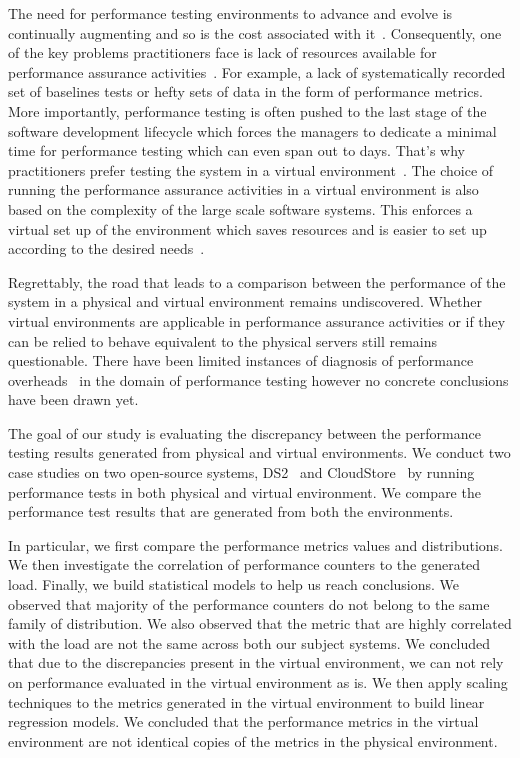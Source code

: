 The need for performance testing environments to advance and evolve is continually augmenting and so is the cost associated with it~\cite{stpmag, bertolino2007software}. Consequently, one of the key problems practitioners face is lack of resources available for performance assurance activities~\cite{jackicsm2009}. For example, a lack of systematically recorded set of baselines tests or hefty sets of data in the form of performance metrics. More importantly, performance testing is often pushed to the last stage of the software development lifecycle which forces the managers to dedicate a minimal time for performance testing which can even span out to days. That's why practitioners prefer testing the system in a virtual environment~\cite{whyvirtualisbetter, vmwarehighcost}. The choice of running the performance assurance activities in a virtual environment is also based on the complexity of the large scale software systems. This enforces a virtual set up of the environment which saves resources and is easier to set up according to the desired needs~\cite{VMWarePowerCLIBlog, seetharaman2006test}. 

Regrettably, the road that leads to a comparison between the performance of the system in a physical and virtual environment remains undiscovered. Whether virtual environments are applicable in performance assurance activities or if they can be relied to behave equivalent to the physical servers still remains questionable. There have been limited instances of diagnosis of performance overheads~\cite{menon2005diagnosing} in the domain of performance testing however no concrete conclusions have been drawn yet. 

The goal of our study is evaluating the discrepancy between the performance testing results generated from physical and virtual environments. 
We conduct two case studies on two open-source systems, DS2~\cite{delldvd} and CloudStore~\cite{cloudstore} by running performance tests in both physical and virtual environment. We compare the performance test results that are generated from both the environments.

In particular, we first compare the performance metrics values and distributions. We then investigate the correlation of performance counters to the generated load. Finally, we build statistical models to help us reach conclusions. 
We observed that majority of the performance counters do not belong to the same family of distribution. We also observed that the metric that are highly correlated with the load are not the same across both our subject systems.
We concluded that due to the discrepancies present in the virtual environment, we can not rely on performance evaluated in the virtual environment as is. We then apply scaling techniques to the metrics generated in the virtual environment to build linear regression models. We concluded that the performance metrics in the virtual environment are not identical copies of the metrics in the physical environment. 


